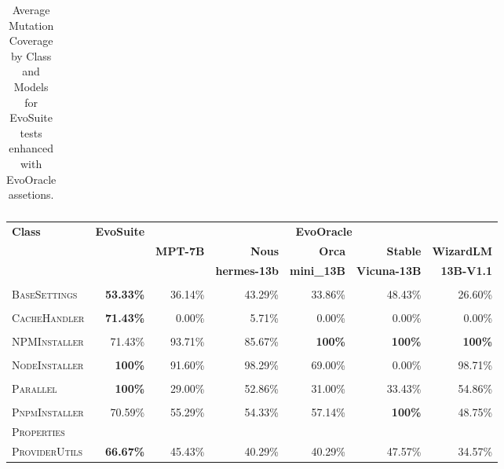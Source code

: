 \begin{table}[H]
\begin{tabular}{| l | r | r | r | r | r | r |}
\end{tabular}
\caption{Average Mutation Coverage by Class and Models for EvoSuite tests enhanced with EvoOracle assetions.\protect\footnotemark}
\label{tab:mutation_coverage}
\end{table}

\begin{table}[H]
\centering

\begin{tabular}{| l | r | r | r | r | r | r |}
\hline
\multirow{2}{*}{\textbf{Class}} & \multirow{2}{*}{\textbf{EvoSuite}} & \multicolumn{5}{c|}{\textbf{EvoOracle}} \\ %
\cline{3-7} %
 &  & \textbf{MPT-7B} & \textbf{Nous} & \textbf{Orca} & \textbf{Stable} & \textbf{WizardLM} \\
 &  &  & \textbf{hermes-13b} & \textbf{mini\_13B} & \textbf{Vicuna-13B} & \textbf{13B-V1.1} \\
\hline
\scriptsize\textsc{} &  &  &  &  &  &  \\
\scriptsize\textsc{BaseSettings} & \textbf{53.33\%} & 36.14\% & 43.29\% & 33.86\% & 48.43\% & 26.60\% \\
\hline
\scriptsize\textsc{} &  &  &  &  &  &  \\
\scriptsize\textsc{CacheHandler} & \textbf{71.43\%} & 0.00\% & 5.71\% & 0.00\% & 0.00\% & 0.00\% \\
\hline
\scriptsize\textsc{} &  &  &  &  &  &  \\
\scriptsize\textsc{NPMInstaller} & 71.43\% & 93.71\% & 85.67\% & \textbf{100\%} & \textbf{100\%} & \textbf{100\%} \\
\hline
\scriptsize\textsc{} &  &  &  &  &  &  \\
\scriptsize\textsc{NodeInstaller} & \textbf{100\%} & 91.60\% & 98.29\% & 69.00\% & 0.00\% & 98.71\% \\
\hline
\scriptsize\textsc{} &  &  &  &  &  &  \\
\scriptsize\textsc{Parallel} & \textbf{100\%} & 29.00\% & 52.86\% & 31.00\% & 33.43\% & 54.86\% \\
\hline
\scriptsize\textsc{} &  &  &  &  &  &  \\
\scriptsize\textsc{PnpmInstaller} & 70.59\% & 55.29\% & 54.33\% & 57.14\% & \textbf{100\%} & 48.75\% \\
\hline
\scriptsize\textsc{Properties} &  &  &  &  &  &  \\
\scriptsize\textsc{ProviderUtils} & \textbf{66.67\%} & 45.43\% & 40.29\% & 40.29\% & 47.57\% & 34.57\% \\

\end{tabular}
\end{table}
